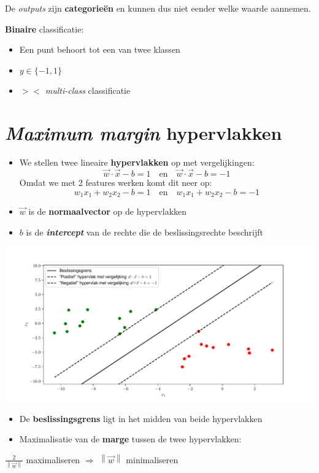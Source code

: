\documentclass[kulak]{kulakposter}
\newcommand{\norm}[1]{\left\| #1 \right\|}
\begin{document}
\begin{multicols}{2}
\begin{multicols}{2}
		De \textit{outputs} zijn \textbf{categorieën} en kunnen dus niet eender welke waarde aannemen.
		
	\end{multicols}
	
	\vspace{1.5cm}
	\textbf{Binaire} classificatie:
	\begin{itemize}
		\item Een punt behoort tot een van twee klassen
		\item \(y \in \{-1,1\}\)
		\item \(><\) \textit{multi-class} classificatie
	\end{itemize}
	\vfill \null
	
	\columnbreak
	\section{\textit{Maximum margin} hypervlakken}
	\begin{itemize}
		\item We stellen twee lineaire \textbf{hypervlakken} op met vergelijkingen:
			\[\vec{w} \cdot \vec{x} - b = 1 \quad \text{en} \quad \vec{w} \cdot \vec{x} - b = -1\]
			Omdat we met 2 features werken komt dit neer op:
			\[w_1x_1 + w_2x_2 - b = 1 \quad \text{en} \quad w_1x_1 + w_2x_2 - b = -1\]
	\end{itemize}
		\begin{itemize}
			\item \(\vec{w}\) is de \textbf{normaalvector} op de hypervlakken
			\item \(b\) is de \textit{\textbf{intercept}} van de rechte die de beslissingsrechte beschrijft
		\end{itemize}
	\photohere
	\centering
	\includegraphics[width=.6\columnwidth]{hypervlakken}
	\begin{itemize}
		\item De \textbf{beslissingsgrens} ligt in het midden van beide hypervlakken
		\item Maximalisatie van de \textbf{marge} tussen de twee hypervlakken:
	\end{itemize}
	\centering
	\vspace{0.5cm}
	\(\frac{2}{\norm{\vec{w}}}\) maximaliseren \(\Rightarrow\) \(\norm{\vec{w}}\) minimaliseren
	
\end{multicols}
\end{document}
